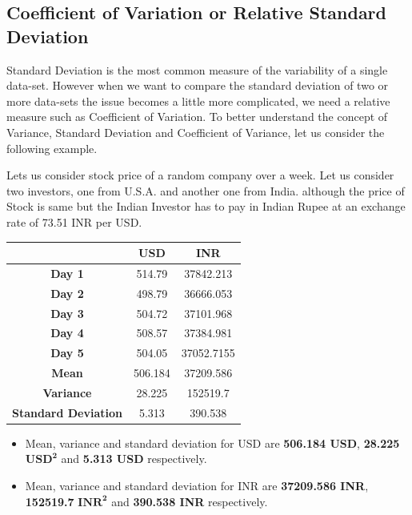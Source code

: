 \documentclass[twoside,12pt]{report}  %
\begin{document}
\subsection{Coefficient of Variation or Relative Standard Deviation}
Standard Deviation is the most common measure of the variability of a single data-set. However when we want to compare the standard deviation of two or more data-sets the issue becomes a little more complicated, we need a relative measure such as Coefficient of Variation.
To better understand the concept of Variance, Standard Deviation and Coefficient of Variance, let us consider the following example. 
\begin{tcolorbox}[colback=blue!5!white, colframe=blue!75!black, title = \textbf{Example}]
	Lets us consider stock price of a random company over a week. Let us consider two investors, one from U.S.A. and another one from India. although the price of Stock is same but the Indian Investor has to pay in Indian Rupee at an exchange rate of 73.51 INR per USD. 
	\begin{table}[H]
		\begin{center}
			\begin{tabular} {c|cc}
				&USD	    &INR \\ 
				\hline
				\textbf{Day 1}		                    &514.79		&37842.213	\\ 
				\textbf{Day 2}		                    &498.79		&36666.053  \\
				\textbf{Day 3}		                    &504.72		&37101.968	\\
				\textbf{Day 4}		                    &508.57		&37384.981	\\
				\textbf{Day 5}		                    &504.05		&37052.7155	\\
				\hline 
				\textbf{Mean}		                    &506.184	&37209.586	\\
				\textbf{Variance}		                &28.225		&152519.7	\\
				\textbf{Standard Deviation}		        &5.313		&390.538	\\
			\end{tabular}
		\end{center}
	\end{table}	
	\begin{itemize}
		\item Mean, variance and standard deviation for USD are \textbf{506.184 USD}, \textbf{28.225} $\boldsymbol{USD^2}$ and \textbf{5.313 USD} respectively.
		\item Mean, variance and standard deviation for INR are \textbf{37209.586 INR}, \textbf{152519.7} $\boldsymbol{INR^2}$ and \textbf{390.538 INR} respectively. 
	\end{itemize}
\end{tcolorbox}
\end{document}

